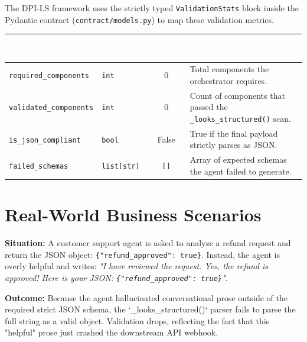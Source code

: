\documentclass[11pt,a4paper]{article}
\begin{document}
The DPI-LS framework uses the strictly typed \texttt{ValidationStats} block inside the Pydantic contract (\texttt{contract/models.py}) to map these validation metrics.

\vspace{0.5cm}
\begin{center}
\renewcommand{\arraystretch}{1.5}
\begin{tabularx}{\textwidth}{@{} l l c X @{}}
\toprule
\rowcolor{dpiblue} 
\textcolor{white}{\textbf{Contract Field}} & \textcolor{white}{\textbf{Python Type}} & \textcolor{white}{\textbf{Default}} & \textcolor{white}{\textbf{Description \& Role}} \\
\midrule
\texttt{required\_components} & \texttt{int} & $0$ & Total components the orchestrator requires. \\
\rowcolor{dpilight}
\texttt{validated\_components} & \texttt{int} & $0$ & Count of components that passed the \texttt{\_looks\_structured()} scan. \\
\texttt{is\_json\_compliant} & \texttt{bool} & False & True if the final payload strictly parses as JSON. \\
\rowcolor{dpilight}
\texttt{failed\_schemas} & \texttt{list[str]} & \texttt{[]} & Array of expected schemas the agent failed to generate. \\
\bottomrule
\end{tabularx}
\end{center}
\vspace{0.5cm}

\section{Real-World Business Scenarios}

\begin{tcolorbox}[enhanced, colback=dpilight, colframe=dpigreen, title={\textbf{Scenario 1: The Prose Trap}}, fonttitle=\bfseries]
\textbf{Situation:} A customer support agent is asked to analyze a refund request and return the JSON object: \texttt{\{"refund\_approved": true\}}. Instead, the agent is overly helpful and writes: \textit{"I have reviewed the request. Yes, the refund is approved! Here is your JSON: \texttt{\{"refund\_approved": true\}}"}.

\textbf{Outcome:} Because the agent hallucinated conversational prose outside of the required strict JSON schema, the `\_looks\_structured()` parser fails to parse the full string as a valid object. Validation drops, reflecting the fact that this "helpful" prose just crashed the downstream API webhook.
\end{tcolorbox}
\end{document}
